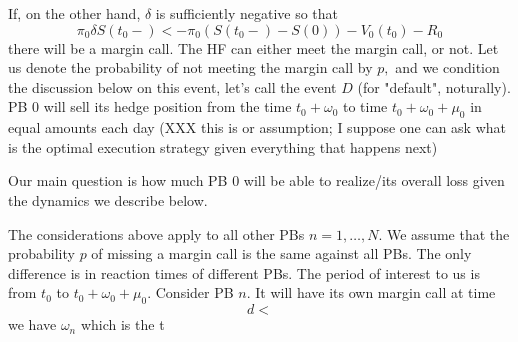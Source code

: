 \documentclass{article}
\begin{document}
If, on the other hand, $\delta $ is sufficiently negative so that 
\[
\pi _{0}\delta S(t_{0}-)<-\pi _{0}\left( S(t_{0}-)-S(0)\right)
-V_{0}(t_{0})-R_{0}
\]%
there will be a margin call. The HF can either meet the margin call, or not.
Let us denote the probability of not meeting the margin call by $p,$ and we
condition the discussion below on this event, let's call the event $D$ (for
"default", noturally). PB $0$ will sell its hedge position from the time $%
t_{0}+\omega _{0}$ to time $t_{0}+\omega _{0}+\mu _{0}$ in equal amounts
each day (XXX this is or assumption; I suppose one can ask what is the
optimal execution strategy given everything that happens next)

Our main question is how much PB $0$ will be able to realize/its overall
loss given the dynamics we describe below.

The considerations above apply to all other PBs $n=1,\dots ,N.$ We assume
that the probability $p$ of missing a margin call is the same against all
PBs. The only difference is in reaction times of different PBs. The period
of interest to us is from $t_{0}$ to $t_{0}+\omega _{0}+\mu _{0}.$ Consider
PB $n.$ It will have its own margin call at time 
\[
d<
\]
we have $\omega _{n}$ which is the t
\end{document}
